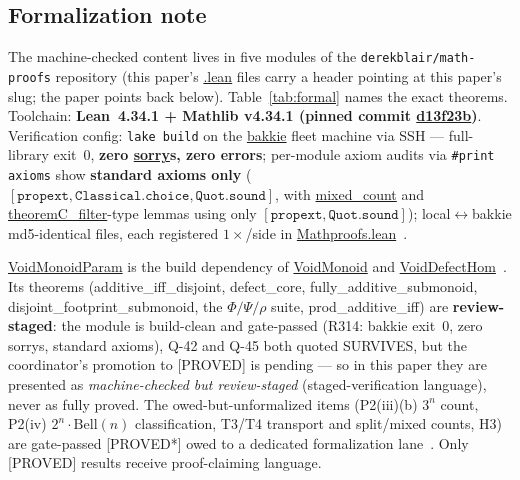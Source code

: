 \documentclass[11pt,a4paper]{article}
\theoremstyle{definition}
\begin{document}
\subsection{Formalization note}
\label{sec:formal}

The machine-checked content lives in five modules of the
\texttt{derekblair/math-proofs} repository (this paper's \url{.lean}
files carry a header pointing at this paper's slug; the paper points
back below). Table~\ref{tab:formal} names the exact theorems. Toolchain:
\textbf{Lean~4.34.1 + Mathlib v4.34.1 (pinned commit
\url{d13f23b})}. Verification config: \texttt{lake build} on the
\url{bakkie} fleet machine via SSH — full-library exit~0,
\textbf{zero \url{sorry}s, zero errors}; per-module axiom audits via
\texttt{\#print axioms} show \textbf{standard axioms only}
($[\mathtt{propext},\mathtt{Classical.choice},\mathtt{Quot.sound}]$,
with \url{mixed_count} and \url{theoremC_filter}-type lemmas
using only $[\mathtt{propext},\mathtt{Quot.sound}]$); local$\leftrightarrow$bakkie
md5-identical files, each registered $1\times$/side in
\url{Mathproofs.lean}~\cite{D310,D314,D318,D322}.

\url{VoidMonoidParam} is the build dependency of \url{VoidMonoid}
and \url{VoidDefectHom}~\cite{D314,D322}. Its theorems
(additive\_iff\_disjoint, defect\_core, fully\_additive\_submonoid,
disjoint\_footprint\_submonoid, the $\Phi/\Psi/\rho$ suite,
prod\_additive\_iff) are \textbf{review-staged}: the module is
build-clean and gate-passed (R314: bakkie exit~0, zero sorrys, standard
axioms), Q-42 and Q-45 both quoted SURVIVES, but the coordinator's
promotion to [PROVED] is pending — so in this paper they are presented
as \emph{machine-checked but review-staged} (staged-verification
language), never as fully proved. The owed-but-unformalized items
(P2(iii)(b) $3^n$ count, P2(iv) $2^n\!\cdot\!\mathrm{Bell}(n)$
classification, T3/T4 transport and split/mixed counts, H3) are
gate-passed [PROVED*] owed to a dedicated formalization lane~\cite{D314}.
Only [PROVED] results receive proof-claiming language.
\end{document}
